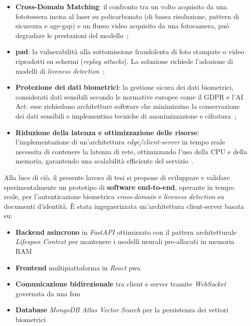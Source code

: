 \begin{itemize}
    \item \textbf{Cross-Domain Matching}: il confronto tra un volto acquisito da una fototessera incisa al laser su policarbonato (di bassa risoluzione, pattern di sicurezza e age-gap) e un flusso video acquisito da una fotocamera, può degradare le prestazioni del modello~\cite{shiDocFaceMatchingID2018};
    \item \textbf{\gls{pad}}: la vulnerabilità alla sottomissione fraudolenta di foto stampate o video riprodotti su schermi (\textit{replay attacks}).  La soluzione richiede l'adozione di modelli di \textit{liveness detection}~\cite{gonzalezForgedPresentationAttack2025};
    \item \textbf{Protezione dei dati biometrici}: la gestione sicura dei dati biometrici, considerati dati sensibili secondo le normative europee come il GDPR e l'AI Act: esse richiedono architetture software che minimizzino la conservazione dei dati sensibili e implementino tecniche di anonimizzazione e cifratura~\cite{otroshishahrezaBenchmarkingCancelableBiometrics2022, sanzGoverningPrivacyPreservingFace2026};
    \item \textbf{Riduzione della latenza e ottimizzazione delle risorse}: l'implementazione di un'architettura \textit{edge/client-server} in tempo reale necessita di contenere la latenza di rete, ottimizzando l'uso della CPU e della memoria, garantendo una scalabilità efficiente del servizio~\cite{georgeLightweightCrossSpectralFace2026}.
\end{itemize}
Alla luce di ciò, il presente lavoro di tesi si propone di sviluppare e validare sperimentalmente un prototipo di \textbf{software end-to-end}, operante in tempo reale, per l'autenticazione biometrica \textit{cross-domain} e \textit{liveness detection} su documenti d'identità.
È stata ingegnerizzata un'architettura client-server basata su:
\begin{itemize}
    \item \textbf{Backend asincrono} in \textit{FastAPI} ottimizzato con il pattern architetturale \textit{Lifespan Context} per mantenere i modelli neurali pre-allocati in memoria RAM
    \item \textbf{Frontend} multipiattaforma in \textit{React} \gls{pwa}
    \item \textbf{Comunicazione bidirezionale} tra client e server tramite \textit{WebSocket} governata da una \gls{fsm}
    \item \textbf{Database} \textit{MongoDB Atlas Vector Search} per la persistenza dei vettori biometrici
\end{itemize}
